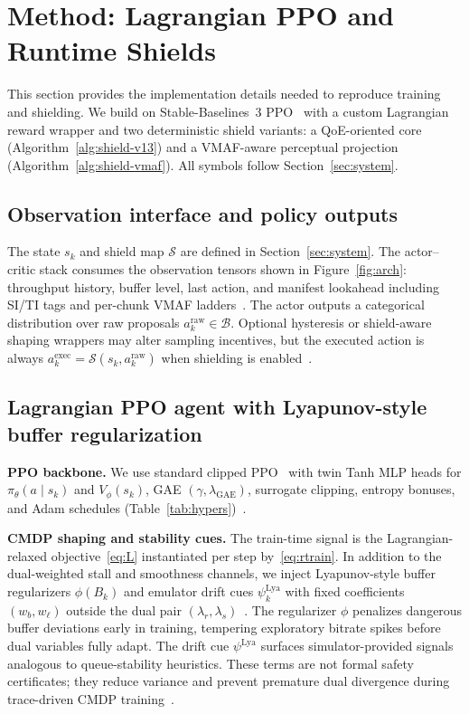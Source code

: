 \documentclass[preprint,12pt,times]{elsarticle}
\begin{document}
\section{Method: Lagrangian PPO and Runtime Shields}
\label{sec:method}

This section provides the implementation details needed to reproduce training and shielding.
We build on Stable-Baselines~3 PPO~\cite{raffin2021sb3,schulman2017proximal} with a custom Lagrangian reward wrapper and two deterministic shield variants: a QoE-oriented core (Algorithm~\ref{alg:shield-v13}) and a VMAF-aware perceptual projection (Algorithm~\ref{alg:shield-vmaf}).
All symbols follow Section~\ref{sec:system}.

\subsection{Observation interface and policy outputs}

The state \(s_k\) and shield map \(\mathcal{S}\) are defined in Section~\ref{sec:system}.
The actor--critic stack consumes the observation tensors shown in Figure~\ref{fig:arch}: throughput history, buffer level, last action, and manifest lookahead including SI/TI tags and per-chunk VMAF ladders~\cite{mao2017neural,sodagar2011mpeg,yin2015control,li2016vmaf}.
The actor outputs a categorical distribution over raw proposals \(a^{\mathrm{raw}}_k\in\mathcal{B}\).
Optional hysteresis or shield-aware shaping wrappers may alter sampling incentives, but the executed action is always \(a^{\mathrm{exec}}_k=\mathcal{S}(s_k,a^{\mathrm{raw}}_k)\) when shielding is enabled~\cite{alshiekh2018shielding}.

\subsection{Lagrangian PPO agent with Lyapunov-style buffer regularization}\label{sec:method:ppo}

\textbf{PPO backbone.}
We use standard clipped PPO~\cite{schulman2017proximal} with twin Tanh MLP heads for \(\pi_\theta(a\mid s_k)\) and \(V_\phi(s_k)\), GAE \((\gamma,\lambda_{\mathrm{GAE}})\), surrogate clipping, entropy bonuses, and Adam schedules (Table~\ref{tab:hypers})~\cite{raffin2021sb3}.

\textbf{CMDP shaping and stability cues.}
The train-time signal is the Lagrangian-relaxed objective~\eqref{eq:L} instantiated per step by~\eqref{eq:rtrain}.
In addition to the dual-weighted stall and smoothness channels, we inject Lyapunov-style buffer regularizers \(\phi(B_k)\) and emulator drift cues \(\psi^{\mathrm{Lya}}_k\) with fixed coefficients \((w_b,w_\ell)\) outside the dual pair \((\lambda_r,\lambda_s)\)~\cite{neely2010stochastic,chow2018lyapunov}.
The regularizer \(\phi\) penalizes dangerous buffer deviations early in training, tempering exploratory bitrate spikes before dual variables fully adapt.
The drift cue \(\psi^{\mathrm{Lya}}\) surfaces simulator-provided signals analogous to queue-stability heuristics.
These terms are not formal safety certificates; they reduce variance and prevent premature dual divergence during trace-driven CMDP training~\cite{paternain2019dual,tian2022towards}.
\end{document}
